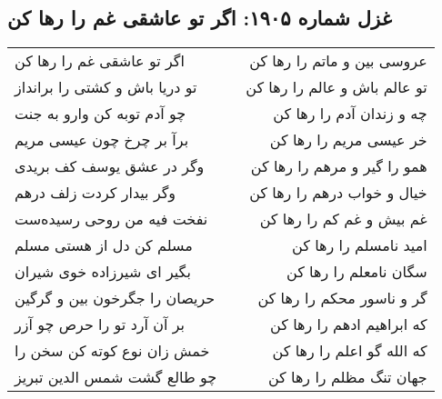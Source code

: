 \begin{center}
\section*{غزل شماره ۱۹۰۵: اگر تو عاشقی غم را رها کن}
\label{sec:1905}
\begin{longtable}{l p{0.5cm} r}
اگر تو عاشقی غم را رها کن
&&
عروسی بین و ماتم را رها کن
\\
تو دریا باش و کشتی را برانداز
&&
تو عالم باش و عالم را رها کن
\\
چو آدم توبه کن وارو به جنت
&&
چه و زندان آدم را رها کن
\\
برآ بر چرخ چون عیسی مریم
&&
خر عیسی مریم را رها کن
\\
وگر در عشق یوسف کف بریدی
&&
همو را گیر و مرهم را رها کن
\\
وگر بیدار کردت زلف درهم
&&
خیال و خواب درهم را رها کن
\\
نفخت فیه من روحی رسیده‌ست
&&
غم بیش و غم کم را رها کن
\\
مسلم کن دل از هستی مسلم
&&
امید نامسلم را رها کن
\\
بگیر ای شیرزاده خوی شیران
&&
سگان نامعلم را رها کن
\\
حریصان را جگرخون بین و گرگین
&&
گر و ناسور محکم را رها کن
\\
بر آن آرد تو را حرص چو آزر
&&
که ابراهیم ادهم را رها کن
\\
خمش زان نوع کوته کن سخن را
&&
که الله گو اعلم را رها کن
\\
چو طالع گشت شمس الدین تبریز
&&
جهان تنگ مظلم را رها کن
\\
\end{longtable}
\end{center}
